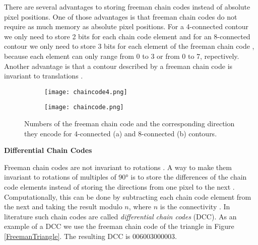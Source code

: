 \documentclass[thesis.tex]{subfiles}
\begin{document}
There are several advantages to storing freeman chain codes instead of absolute pixel positions. One of those advantages is that freeman chain codes do not require as much memory as absolute pixel positions. For a 4-connected contour we only need to store 2 bits for each chain code element and for an 8-connected contour we only need to store 3 bits for each element of the freeman chain code \cite{Ballard:1982:CV:578131}, because each element can only range from 0 to 3 or from 0 to 7, repectively. Another advantage is that a contour described by a freeman chain code is invariant to translations \cite{yang2008su}.
\begin{figure}
	\begin{subfigure}[t]{0.4\textwidth}
		\texttt{[image: chaincode4.png]}
	\caption{}		
	\end{subfigure}
\hspace{0.1\textwidth}
	\begin{subfigure}[t]{0.4\textwidth}
		\texttt{[image: chaincode.png]}		
\caption{}	
	\end{subfigure}
	\caption{Numbers of the freeman chain code  and the corresponding direction they encode for 4-connected (a) and 8-connected (b) contours.}
\label{fig:freeman}
\end{figure}

\textbf{Differential Chain Codes}

 Freeman chain codes are not invariant to rotations \cite{yang2008su,Ballard:1982:CV:578131}. A way to make them invariant to rotations of multiples of 90\si{\degree} is to store the differences of the chain code elements instead of storing the directions from one pixel to the next  \cite{yang2008su}. Computationally, this can be done by subtracting each chain code element from the next and taking the result modulo $n$, where $n$ is the connectivity \cite{yang2008su}. In literature such chain codes are called \textit{differential chain codes} (DCC). As an example of a DCC we use the freeman chain code of the triangle in Figure \ref{FreemanTriangle}. The resulting DCC is 006003000003.
\end{document}
